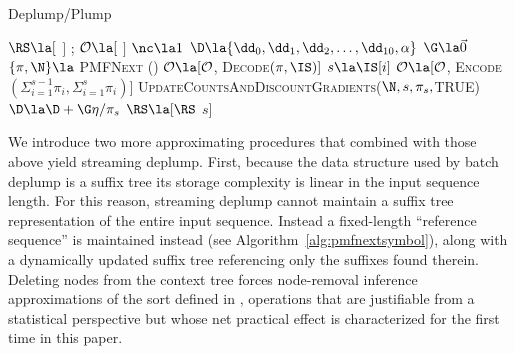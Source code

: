 \begin{algorithm}[t!]
    \caption{Deplump/Plump} \label{alg:deplump/plump}
    \begin{algorithmic}[1]
		\State $\RS \la [$ $]$ ;  $\mathcal{O} \la  [$ $]$%
		\State $\nc \la 1$ 
		\State $\D \la  \{ \dd_0, \dd_1, \dd_2, \dots, \dd_{10}, \alpha \}$ 
			\State $\G \la \vec 0$ 
			\State $ \{ \pi, \N  \} \la$  \textsc{PMFNext} (\RS)
				\State $\mathcal{O} \la [\mathcal{O}$,  \textsc{Decode}$(\pi, \IS)]$
			\Else
				\State $s \la \IS[i]$
				\State $\mathcal{O}\la [\mathcal{O}$,   \textsc{Encode}$(\Sigma_{i = 1}^{s-1} \pi_i, \Sigma_{i = 1}^{s} \pi_i)]$		
			\EndIf
			\State \textsc{UpdateCountsAndDiscountGradients}($\N,s,\pi_s,$TRUE)
			\State $\D \la \D + \G \eta / \pi_s$ 
			\State $\RS \la [\RS$ $s]$ 
		\EndFor
	\EndProcedure
	\end{algorithmic}
\end{algorithm}

We introduce two more approximating procedures that combined with those above yield streaming deplump.  First, because the data structure used by batch deplump is a suffix tree its storage complexity is linear in the input sequence length.  For this reason, streaming deplump cannot maintain a suffix tree representation of the entire input sequence.  Instead a fixed-length ``reference sequence''  is maintained instead (see Algorithm~\ref{alg:pmfnextsymbol}), along with a dynamically updated suffix tree referencing only the suffixes found therein.  Deleting nodes from the context tree forces node-removal inference approximations of the sort defined in \citep{Bartlett2010}, operations that are justifiable from a statistical perspective but whose net practical effect is characterized for the first time in this paper. %

